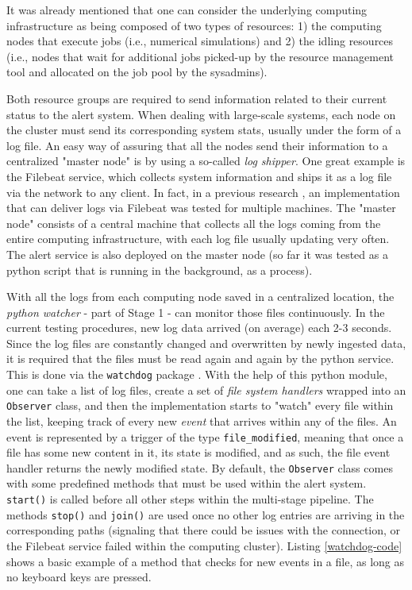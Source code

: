 \documentclass[conference]{IEEEtran}
\begin{document}
It was already mentioned that one can consider the underlying computing infrastructure as being composed of two types of resources: 1) the computing nodes that execute jobs (i.e., numerical simulations) and 2) the idling resources (i.e., nodes that wait for additional jobs picked-up by the resource management tool and allocated on the job pool by the sysadmins).
\par Both resource groups are required to send information related to their current status to the alert system. When dealing with large-scale systems, each node on the cluster must send its corresponding system stats, usually under the form of a log file. An easy way of assuring that all the nodes send their information to a centralized "master node" is by using a so-called \emph{log shipper}. One great example is the Filebeat \cite{filebeat} service, which collects system information and ships it as a log file via the network to any client. In fact, in a previous research \cite{poenaru-elk}, an implementation that can deliver logs via Filebeat was tested for multiple machines. The "master node" consists of a central machine that collects all the logs coming from the entire computing infrastructure, with each log file usually updating very often. The alert service is also deployed on the master node (so far it was tested as a python script that is running in the background, as a process).
\par With all the logs from each computing node saved in a centralized location, the \emph{python watcher} - part of Stage 1 - can monitor those files continuously. In the current testing procedures, new log data arrived (on average) each 2-3 seconds. Since the log files are constantly changed and overwritten by newly ingested data, it is required that the files must be read again and again by the python service. This is done via the \texttt{watchdog} package \cite{watchdog}. With the help of this python module, one can take a list of log files, create a set of \emph{file system handlers} wrapped into an \texttt{Observer} class, and then the implementation starts to "watch" every file within the list, keeping track of every new \emph{event} that arrives within any of the files. An event is represented by a trigger of the type \texttt{file\_modified}, meaning that once a file has some new content in it, its state is modified, and as such, the file event handler returns the newly modified state. By default, the \texttt{Observer} class comes with some predefined methods that must be used within the alert system. \texttt{start()} is called before all other steps within the multi-stage pipeline. The methods \texttt{stop()} and \texttt{join()} are used once no other log entries are arriving in the corresponding paths (signaling that there could be issues with the connection, or the Filebeat service failed within the computing cluster). Listing \ref{watchdog-code} shows a basic example of a method that checks for new events in a file, as long as no keyboard keys are pressed.
\end{document}
